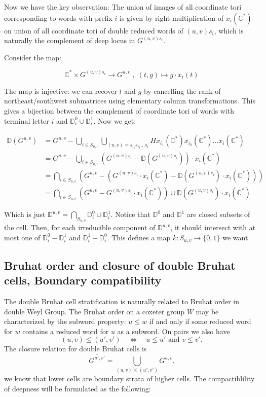\documentclass[12pt]{amsart}
\newcommand{\C}{\mathbb C}
\newcommand{\D}{\mathbb D}
\newcommand{\ol}{\overline}
\theoremstyle{plain}
\theoremstyle{definition}
\theoremstyle{remark}
\begin{document}
Now we have the key observation: The union of images of all coordinate tori corresponding to words with prefix $i$ is given by right multiplication of $x_i(\C^*)$ on union of all coordinate tori of double reduced words of $(u,v)s_i$, which is naturally the complement of deep locus in $G^{(u,v)s_i}$. 

Consider the map:

\[
\C^* \times G^{(u,v)s_i}\to G^{u,v}\;,\; (t,g) \mapsto g \cdot x_i(t)
\]

The map is injective: we can recover $t$ and $g$ by cancelling the rank of
northeast/southwest submatrices using elementary column transformations.
This gives a bijection between the complement of coordinate tori of words
with terminal letter $i$ and $\D^{0}_i\cup \D^{1}_i$.
Now we get:


\[
\begin{aligned}
\D(G^{u,v})&=G^{u,v}-\bigcup_{i\in S_{u,v}}\bigcup_{(u,v)=s_{i_1}s_{i_2}...s_{i}}Hx_{i_1}(\C^*)x_{i_2}(\C^*)...x_{i}(\C^*)\\
&=G^{u,v}-\bigcup_{i\in S_{u,v}}(G^{(u,v)s_i}-\D(G^{(u,v)s_i}))\cdot x_{i}(\C^*)\\
&=\bigcap_{i\in S_{u,v}}(G^{u,v}-(G^{(u,v)s_i}\cdot x_{i}(\C^*)-\D(G^{(u,v)s_i})\cdot x_{i}(\C^*)))\\
&=\bigcap_{i\in S_{u,v}}(G^{u,v}-G^{(u,v)s_i}\cdot x_{i}(\C^*))\cup \D(G^{(u,v)s_i})\cdot x_{i}(\C^*)
\end{aligned}
\]


Which is just $\D^{u,v}=\bigcap_{S_{u,v}} \D^{0}_i\cup \D^{1}_i$. Notice that $\D^{0}$ and ${\D^{1}}$ are closed subsets of the cell. Then, for each irreducible component of $\D^{u,v}$, it should  intersect with at most one of  $\D^{0}_i-{\D^1_i}$ and $\D^1_{i}-\D^0_{i}$. This defines a map  $k: S_{u,v} \to \{0,1\}$ we want.


\subsection{Bruhat order and closure of double Bruhat cells, Boundary compatibility}

The double Bruhat cell stratification is naturally related to Bruhat order in double Weyl Group. The Bruhat order on a coxeter group $W$ may be characterized by the subword property: $u\leq w$ if and only if some reduced word for $w$ contains a reduced word for $u$ as a subword.  On pairs we also have
\[
   (u,v)\leq(u',v')
   \quad\Longleftrightarrow\quad
   u\leq u'\text{ and }v\leq v'.
\]
The closure relation for double Bruhat cells is
\[
   \ol{G^{u',v'}}=\bigcup_{(u,v)\leq(u',v')}G^{u,v}.
\]
we know that lower cells are boundary strata of higher cells. The compactiblility of deepness will be formulated as the following:
\end{document}
